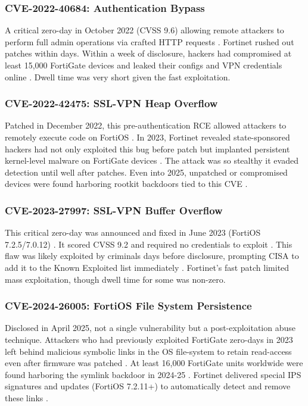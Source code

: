 \documentclass[12pt]{article}
\begin{document}
\subsubsection{CVE-2022-40684: Authentication Bypass}
A critical zero-day in October 2022 (CVSS 9.6) allowing remote attackers to perform full admin operations via crafted HTTP requests \cite{securityweek2022}. Fortinet rushed out patches within days. Within a week of disclosure, hackers had compromised at least 15,000 FortiGate devices and leaked their configs and VPN credentials online \cite{securityweek2022}. Dwell time was very short given the fast exploitation.

\subsubsection{CVE-2022-42475: SSL-VPN Heap Overflow}
Patched in December 2022, this pre-authentication RCE allowed attackers to remotely execute code on FortiOS \cite{fortinetvuln2023}. In 2023, Fortinet revealed state-sponsored hackers had not only exploited this bug before patch but implanted persistent kernel-level malware on FortiGate devices \cite{fortinetvuln2023}. The attack was so stealthy it evaded detection until well after patches. Even into 2025, unpatched or compromised devices were found harboring rootkit backdoors tied to this CVE \cite{bleepingcomputer2025}.

\subsubsection{CVE-2023-27997: SSL-VPN Buffer Overflow}
This critical zero-day was announced and fixed in June 2023 (FortiOS 7.2.5/7.0.12) \cite{fortinet27997}. It scored CVSS 9.2 and required no credentials to exploit \cite{fortinet27997}. This flaw was likely exploited by criminals days before disclosure, prompting CISA to add it to the Known Exploited list immediately \cite{fortinet27997} \cite{cybergc27997}. Fortinet's fast patch limited mass exploitation, though dwell time for some was non-zero.

\subsubsection{CVE-2024-26005: FortiOS File System Persistence}
Disclosed in April 2025, not a single vulnerability but a post-exploitation abuse technique. Attackers who had previously exploited FortiGate zero-days in 2023 left behind malicious symbolic links in the OS file-system to retain read-access even after firmware was patched \cite{bleepingcomputer2025} \cite{fortinetthreat2025}. At least 16,000 FortiGate units worldwide were found harboring the symlink backdoor in 2024-25 \cite{fortinetthreat2025}. Fortinet delivered special IPS signatures and updates (FortiOS 7.2.11+) to automatically detect and remove these links \cite{bleepingcomputer2025}.
\end{document}
